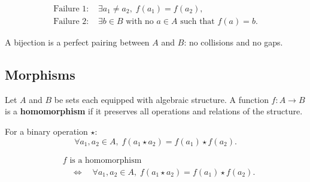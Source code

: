 \begin{remark*}
\[
\begin{aligned}
\text{Failure 1: } &\exists a_1 \ne a_2,\; f(a_1)=f(a_2), \\
\text{Failure 2: } &\exists b \in B \text{ with no } a \in A \text{ such that } f(a)=b.
\end{aligned}
\]
\end{remark*}

\begin{remark*}[Interpretation]
A bijection is a perfect pairing between $A$ and $B$: no collisions and no gaps.
\end{remark*}










\subsection{Morphisms}



\begin{tcolorbox}[title={Definition --- Homomorphism}]
\begin{definition}[Homomorphism]
\label{def:homomorphism}
Let $A$ and $B$ be sets each equipped with algebraic structure.
A function $f : A \to B$ is a \textbf{homomorphism} if it preserves
all operations and relations of the structure.

For a binary operation $\star$:
\[
\forall a_1, a_2 \in A,\;
f(a_1 \star a_2) = f(a_1)\star f(a_2).
\]
\end{definition}
\end{tcolorbox}

\begin{remark*}
\[
\begin{aligned}
&f \text{ is a homomorphism} \\
&\quad\Longleftrightarrow\quad
\forall a_1,a_2 \in A,\;
f(a_1 \star a_2)=f(a_1)\star f(a_2).
\end{aligned}
\]
\end{remark*}

